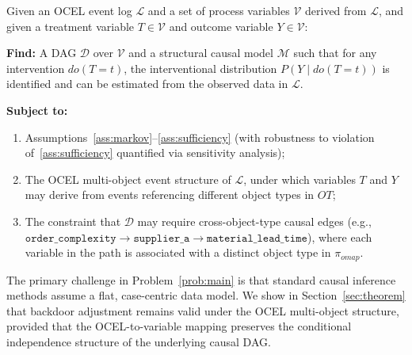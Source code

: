 \begin{problem}
\label{prob:main}
Given an OCEL event log $\mathcal{L}$ and a set of process variables
$\mathcal{V}$ derived from $\mathcal{L}$, and given a treatment variable
$T \in \mathcal{V}$ and outcome variable $Y \in \mathcal{V}$:

\textbf{Find:} A DAG $\mathcal{D}$ over $\mathcal{V}$ and a structural
causal model $\mathcal{M}$ such that for any intervention $do(T = t)$,
the interventional distribution $P(Y \mid do(T = t))$ is identified and
can be estimated from the observed data in $\mathcal{L}$.

\textbf{Subject to:}
\begin{enumerate}
    \item Assumptions~\ref{ass:markov}--\ref{ass:sufficiency} (with robustness
          to violation of~\ref{ass:sufficiency} quantified via sensitivity analysis);
    \item The OCEL multi-object event structure of $\mathcal{L}$, under which
          variables $T$ and $Y$ may derive from events referencing different
          object types in $\mathit{OT}$;
    \item The constraint that $\mathcal{D}$ may require cross-object-type
          causal edges (e.g., $\texttt{order\_complexity} \to
          \texttt{supplier\_a} \to \texttt{material\_lead\_time}$), where
          each variable in the path is associated with a distinct object type
          in $\pi_{\mathit{omap}}$.
\end{enumerate}
\end{problem}

\noindent The primary challenge in Problem~\ref{prob:main} is that standard
causal inference methods assume a flat, case-centric data model. We show in
Section~\ref{sec:theorem} that backdoor adjustment remains valid under the
OCEL multi-object structure, provided that the OCEL-to-variable mapping
preserves the conditional independence structure of the underlying causal DAG.
